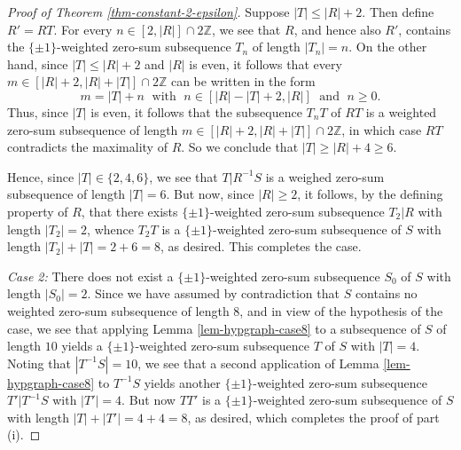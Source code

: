 \documentclass[11pt,reqno]{amsart}
\numberwithin{equation}{section}
\theoremstyle{definition}
\numberwithin{equation}{section}
\begin{document}
\begin{proof}[Proof of Theorem \ref{thm-constant-2-epsilon}]
 Suppose $|T|\leq |R|+2$.  Then define $R'=RT$. For every $n\in
 [2,|R|]\cap 2{\mathbb Z}$, we see that $R$, and hence also $R'$, contains the
 $\{\pm 1\}$-weighted zero-sum subsequence $T_n$ of length $|T_n|=n$. On
 the other hand, since $|T|\leq |R|+2$ and $|R|$ is even, it follows that
 every $m\in [|R|+2,|R|+|T|]\cap 2{\mathbb Z}$ can be written in the form
 $$m=|T|+n\;\mbox{ with }\;n\in [|R|-|T|+2,|R|]{\;\mbox{ and } \;} n\geq 0.$$ Thus, since $|T|$ is even, it follows that
 the
 subsequence $T_nT$ of $RT$ is a weighted zero-sum subsequence of length $m\in
 [|R|+2,|R|+|T|]\cap 2{\mathbb Z}$, in which case $RT$ contradicts the maximality
of $R$. So we conclude that $|T|\geq |R|+4\geq 6$.

 Hence, since $|T|\in \{2,4,6\}$, we see that $T|R^{-1}S$ is a weighed
zero-sum subsequence of length $|T|=6$.
 But now, since $|R|\geq 2$, it follows, by the defining property of $R$,
 that there exists  $\{\pm 1\}$-weighted zero-sum subsequence $T_2|R$ with
 length $|T_2|=2$, whence $T_2T$ is a $\{\pm 1\}$-weighted zero-sum
 subsequence of $S$ with length $|T_2|+|T|=2+6=8$, as desired. This
completes the case.

\medskip

{\it Case 2: } There does not exist a $\{\pm 1\}$-weighted zero-sum
subsequence $S_0$ of $S$ with length $|S_0|=2$.
 Since we have assumed by contradiction that $S$ contains no weighted
 zero-sum subsequence of length $8$, and in view of the hypothesis of the case, we see
 that applying Lemma \ref{lem-hypgraph-case8} to a subsequence of $S$ of
 length $10$ yields a $\{\pm 1\}$-weighted zero-sum subsequence $T$ of $S$
 with $|T|=4$. Noting that $|T^{-1}S|=10$, we see that a second
 application of Lemma \ref{lem-hypgraph-case8} to $T^{-1}S$ yields another
 $\{\pm 1\}$-weighted zero-sum subsequence $T'|T^{-1}S$ with $|T'|=4$. But
 now $TT'$ is a $\{\pm 1\}$-weighted zero-sum subsequence of $S$ with
 length $|T|+|T'|=4+4=8$, as desired, which completes the proof of part (i).

 \bigskip


\end{proof}
\end{document}

